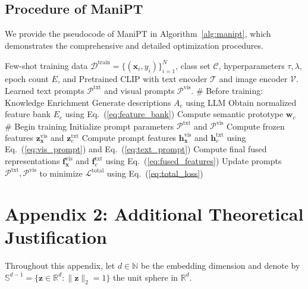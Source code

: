 \documentclass{article}
\theoremstyle{plain}
\theoremstyle{definition}
\theoremstyle{remark}
\begin{document}
	\subsection{Procedure of ManiPT}
	\label{alg:manipt1}
	We provide the pseudocode of ManiPT in Algorithm~\ref{alg:manipt}, which demonstrates the comprehensive and detailed optimization procedures.
	\begin{algorithm}[h]
		\caption{Pipeline of ManiPT}
		\label{alg:manipt}
		\begin{algorithmic}[1]
			 Few-shot training data $\mathcal{D}^{\mathrm{train}}=\{(\mathbf{x}_{i},y_{i})\}_{i=1}^{N}$, class set $\mathcal{C}$, hyperparameters $\tau, \lambda$, epoch count $E$, and Pretrained CLIP with text encoder $\mathcal{T}$ and image encoder $\mathcal{V}$.
			 Learned text prompts $\mathcal{P}^{\mathrm{txt}}$ and visual prompts $\mathcal{P}^{\mathrm{vis}}$.
			\STATE \# Before training: Knowledge Enrichment
			\STATE Generate descriptions $A_c$ using LLM
			\STATE Obtain normalized feature bank $E_c$ using Eq.~(\ref{eq:feature_bank})
			\STATE Compute semantic prototype $\mathbf{w}_{c}$
			\ENDFOR
			\STATE \# Begin training
			\STATE Initialize prompt parameters $\mathcal{P}^{\mathrm{txt}}$ and $\mathcal{P}^{\mathrm{vis}}$
			\STATE Compute frozen features $\mathbf{z}^{\mathrm{vis}}_{\mathbf{x}}$ and $\mathbf{z}^{\mathrm{txt}}_{c}$
			\STATE Compute prompt features $\mathbf{h}^{\mathrm{vis}}_{\mathbf{x}}$ and $\mathbf{h}^{\mathrm{txt}}_{c}$ using Eq.~(\ref{eq:vis_prompt}) and Eq.~(\ref{eq:text_prompt})
			\STATE Compute final fused representations $\mathbf{f}^{\mathrm{vis}}_{\mathbf{x}}$ and $\mathbf{f}^{\mathrm{txt}}_{c}$ using Eq.~(\ref{eq:fused_features})
			\STATE Update prompts $\mathcal{P}^{\mathrm{txt}}, \mathcal{P}^{\mathrm{vis}}$ to minimize $\mathcal{L}^{\mathrm{total}}$ using Eq.~(\ref{eq:total_loss})
			\ENDFOR
			\ENDFOR
		\end{algorithmic}
	\end{algorithm}
	\section{Appendix 2: Additional Theoretical Justification}
	\label{app:theory2}
	Throughout this appendix, let $d\in\mathbb N$ be the embedding dimension and denote by $\mathbb S^{d-1}=\{\mathbf{z}\in\mathbb R^d:\|\mathbf{z}\|_2=1\}$ the unit sphere in $\mathbb R^d$.
\end{document}
